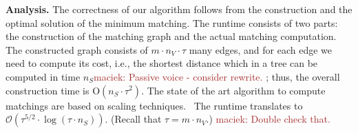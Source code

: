 \documentclass[9pt]{sigcomm-alternate}
\newcommand{\maciek}[1]{\textcolor{brown}{maciek: #1}}
\newcommand{\MaFactor}{m}
\newcommand{\ChunkType}{\tau}
\begin{document}
\textbf{Analysis.}
The correctness of our algorithm follows from the construction and the optimal
solution of the minimum matching.
The runtime consists of two parts: the construction of the matching graph and
the actual matching computation. The constructed graph consists of
$\MaFactor \cdot n_V \cdot \ChunkType$ many edges,
and for each edge we need to compute its cost, i.e., the shortest distance
which in a tree can be computed in time $n_S$\maciek{Passive voice - consider rewrite.}
; thus, the overall construction time
is
$\mathrm{O}(n_S \cdot \tau^2)$.
The state of the art algorithm to compute matchings are based on scaling techniques.~\cite{scale-match}
The runtime translates to
$\mathcal{O}(\tau^{5/2}\cdot \log(\tau\cdot n_S))$.
(Recall that $\tau = \MaFactor\cdot n_V$.) \maciek{Double check that.}


%
%
\end{document}

